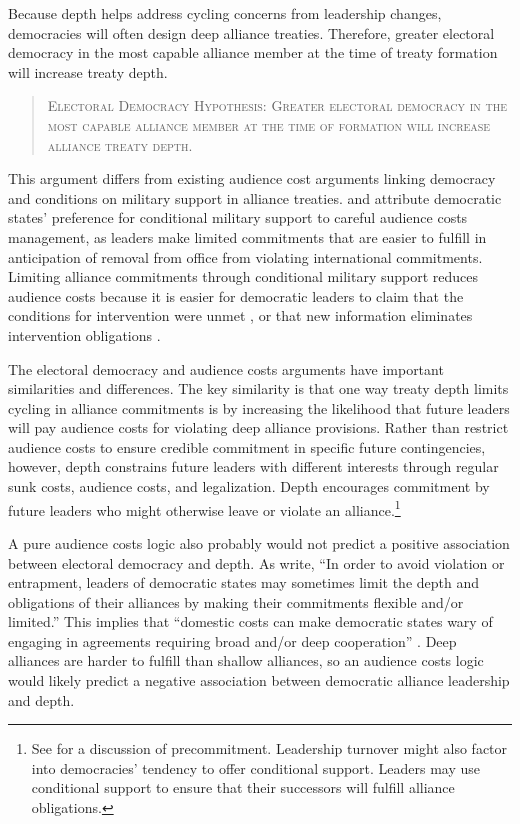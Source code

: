 \documentclass[12pt]{article}
\begin{document}
Because depth helps address cycling concerns from leadership changes, democracies will often design deep alliance treaties. 
Therefore, greater electoral democracy in the most capable alliance member at the time of treaty formation will increase treaty depth. 


\begin{quote}
\textsc{Electoral Democracy Hypothesis: Greater electoral democracy in the most capable alliance member at the time of formation will increase alliance treaty depth.}
\end{quote}   


This argument differs from existing audience cost arguments linking democracy and conditions on military support in alliance treaties. 
\citet{Mattes2012} and \citet{Chibaetal2015} attribute democratic states' preference for conditional military support to careful audience costs management, as leaders make limited commitments that are easier to fulfill in anticipation of removal from office from violating international commitments.
Limiting alliance commitments through conditional military support reduces audience costs because it is easier for democratic leaders to claim that the conditions for intervention were unmet \citep{FjelstulReiter2019}, or that new information eliminates intervention obligations \citep{LevenduskyHorowitz2012}. 


The electoral democracy and audience costs arguments have important similarities and differences. 
The key similarity is that one way treaty depth limits cycling in alliance commitments is by increasing the likelihood that future leaders will pay audience costs for violating deep alliance provisions. 
Rather than restrict audience costs to ensure credible commitment in specific future contingencies, however, depth constrains future leaders with different interests through regular sunk costs, audience costs, and legalization. 
Depth encourages commitment by future leaders who might otherwise leave or violate an alliance.\footnote{See \citet{Mattes2012a} for a discussion of precommitment. Leadership turnover might also factor into democracies' tendency to offer conditional support. Leaders may use conditional support to ensure that their successors will fulfill alliance obligations.} 


A pure audience costs logic also probably would not predict a positive association between electoral democracy and depth.
As \citet[pg. 972]{Chibaetal2015} write, ``In order to avoid violation or entrapment, leaders of democratic states may sometimes limit the depth and obligations of their alliances by making their commitments flexible and/or limited.''
This implies that ``domestic costs can make democratic states wary of engaging in agreements requiring broad and/or deep cooperation'' \citep[pg. 980]{Chibaetal2015}.
Deep alliances are harder to fulfill than shallow alliances, so an audience costs logic would likely predict a negative association between democratic alliance leadership and depth. 
\end{document}
